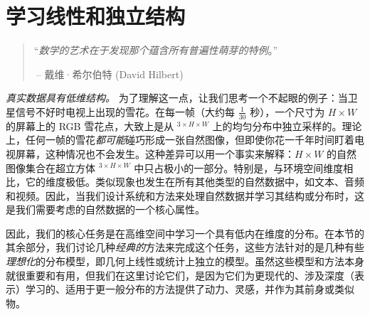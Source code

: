 \documentclass[../../book-main.tex]{subfiles}
\begin{document}
\chapter{学习线性和独立结构}
\label{ch:classic}\label{ch:linear-independent}

\begin{quote}
\hfill  “{\em 数学的艺术在于发现那个蕴含所有普遍性萌芽的特例}。”


$~$\hfill -- 戴维·希尔伯特 (David Hilbert)
\end{quote}
\vspace{5mm}







\textit{真实数据具有低维结构。} 为了理解这一点，让我们思考一个不起眼的例子：当卫星信号不好时电视上出现的雪花。在每一帧（大约每 \(\frac{1}{30}\) 秒），一个尺寸为 \(H \times W\) 的屏幕上的 RGB 雪花点，大致上是从 \(^{3 \times H \times W}\) 上的均匀分布中独立采样的。理论上，任何一帧的雪花\textit{都可能}碰巧形成一张自然图像，但即使你花一千年时间盯着电视屏幕，这种情况也不会发生。这种差异可以用一个事实来解释：\(H \times W\) 的自然图像集合在超立方体 \(^{3 \times H \times W}\) 中只占极小的一部分。特别是，与环境空间维度相比，它的维度极低。类似现象也发生在所有其他类型的自然数据中，如文本、音频和视频。因此，当我们设计系统和方法来处理自然数据并学习其结构或分布时，这是我们需要考虑的自然数据的一个核心属性。%

因此，我们的核心任务是在高维空间中学习一个具有低内在维度的分布。在本节的其余部分，我们讨论几种\textit{经典的}方法来完成这个任务，这些方法针对的是几种有些\textit{理想化}的分布模型，即几何上线性或统计上独立的模型。虽然这些模型和方法本身就很重要和有用，但我们在这里讨论它们，是因为它们为更现代的、涉及深度（表示）学习的、适用于更一般分布的方法提供了动力、灵感，并作为其前身或类似物。
\end{document}
